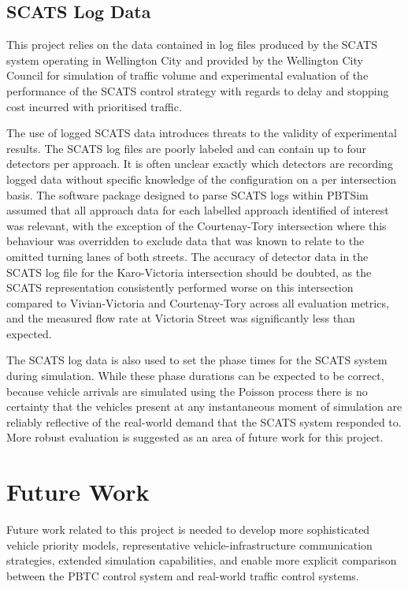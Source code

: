 \subsection{SCATS Log Data}

 This project relies on the data contained in log files produced by the SCATS system operating in Wellington City and provided by the Wellington City Council for simulation of traffic volume and experimental evaluation of the performance of the SCATS control strategy with regards to delay and stopping cost incurred with prioritised traffic.
 
The use of logged SCATS data introduces threats to the validity of experimental results. The SCATS log files are poorly labeled and can contain up to four detectors per approach. It is often unclear exactly which detectors are recording logged data without specific knowledge of the configuration on a per intersection basis. The software package designed to parse SCATS logs within PBTSim assumed that all approach data for each labelled approach identified of interest was relevant, with the exception of the Courtenay-Tory intersection where this behaviour was overridden to exclude data that was known to relate to the omitted turning lanes of both streets. The accuracy of detector data in the SCATS log file for the Karo-Victoria intersection should be doubted, as the SCATS representation consistently performed worse on this intersection compared to Vivian-Victoria and Courtenay-Tory across all evaluation metrics, and the measured flow rate at Victoria Street was significantly less than expected.

The SCATS log data is also used to set the phase times for the SCATS system during simulation. While these phase durations can be expected to be correct, because vehicle arrivals are simulated using the Poisson process there is no certainty that the vehicles present at any instantaneous moment of simulation are reliably reflective of the real-world demand that the SCATS system responded to. More robust evaluation is suggested as an area of future work for this project.
 
\section{Future Work}

Future work related to this project is needed to develop more sophisticated vehicle priority models, representative vehicle-infrastructure communication strategies, extended simulation capabilities, and enable more explicit comparison between the PBTC control system and real-world traffic control systems.

